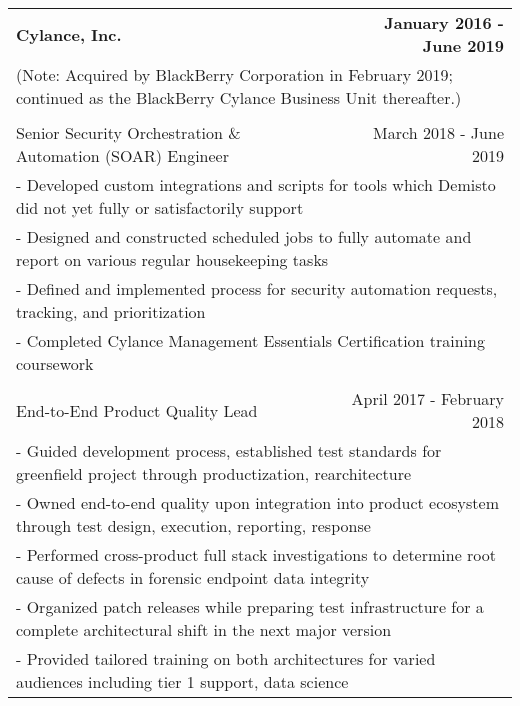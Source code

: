 \documentclass[letterpaper]{article}
\begin{document}
\begin{center}
\begin{tabular}{p{}p{}r}
				\textbf{Cylance, Inc.} & &
				\textbf{January 2016 - June 2019\quad}
			\\		%
				\multicolumn{3}{p{\textwidth}}{(Note: Acquired by BlackBerry Corporation in February 2019; continued as the BlackBerry Cylance Business Unit thereafter.)}
			\\
			\\
				\multicolumn{2}{p{0.5\textwidth}}{\quad Senior Security Orchestration \& Automation (SOAR) Engineer}
				&
				{March 2018 - June 2019 \quad\quad\quad\quad}
			\\
				\multicolumn{3}{p{\textwidth}}{\quad\quad - Developed custom integrations and scripts for tools which Demisto did not yet fully or satisfactorily support}
			\\
				\multicolumn{3}{p{\textwidth}}{\quad\quad - Designed and constructed scheduled jobs to fully automate and report on various regular housekeeping tasks}
			\\
				\multicolumn{3}{p{\textwidth}}{\quad\quad - Defined and implemented process for security automation requests, tracking, and prioritization}
			\\
				\multicolumn{3}{p{\textwidth}}{\quad\quad - Completed Cylance Management Essentials Certification training coursework}
			\\
		  \\		%
			  \multicolumn{2}{p{0.5\textwidth}}{\quad End-to-End Product Quality Lead}
			  &
			  {April 2017 - February 2018 \quad\quad\quad\quad}
		  \\
			  \multicolumn{3}{p{\textwidth}}{\quad\quad - Guided development process, established test standards for greenfield project through productization, rearchitecture} 
		  \\
			  \multicolumn{3}{p{\textwidth}}{\quad\quad - Owned end-to-end quality upon integration into product ecosystem through test design, execution, reporting, response} 
		  \\
			  \multicolumn{3}{p{\textwidth}}{\quad\quad - Performed cross-product full stack investigations to determine root cause of defects in forensic endpoint data integrity} 
		  \\
			  \multicolumn{3}{p{\textwidth}}{\quad\quad - Organized patch releases while preparing test infrastructure for a complete architectural shift in the next major version} 
		  \\
			  \multicolumn{3}{p{\textwidth}}{\quad\quad - Provided tailored training on both architectures for varied audiences including tier 1 support, data science}

\end{tabular}
\end{center}
\end{document}
